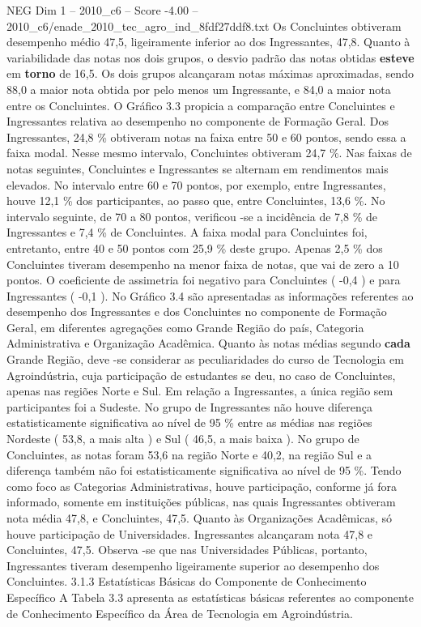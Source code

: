 \begin{textsample}{NEG Dim 1 – 2010\_c6 – Score -4.00 – 2010\_c6/enade\_2010\_tec\_agro\_ind\_8fdf27ddf8.txt}
Os Concluintes obtiveram desempenho médio 47,5, ligeiramente inferior ao dos Ingressantes, 47,8.
Quanto à variabilidade das notas nos dois grupos, o desvio padrão das notas obtidas \textbf{esteve} em \textbf{torno} de 16,5.
Os dois grupos alcançaram notas máximas aproximadas, sendo 88,0 a maior nota obtida por pelo menos um Ingressante, e 84,0 a maior nota entre os Concluintes.
O Gráfico 3.3 propicia a comparação entre Concluintes e Ingressantes relativa ao desempenho no componente de Formação Geral.
Dos Ingressantes, 24,8 \% obtiveram notas na faixa entre 50 e 60 pontos, sendo essa a faixa modal.
Nesse mesmo intervalo, Concluintes obtiveram 24,7 \%.
Nas faixas de notas seguintes, Concluintes e Ingressantes se alternam em rendimentos mais elevados.
No intervalo entre 60 e 70 pontos, por exemplo, entre Ingressantes, houve 12,1 \% dos participantes, ao passo que, entre Concluintes, 13,6 \%.
No intervalo seguinte, de 70 a 80 pontos, verificou -se a incidência de 7,8 \% de Ingressantes e 7,4 \% de Concluintes.
A faixa modal para Concluintes foi, entretanto, entre 40 e 50 pontos com 25,9 \% deste grupo.
Apenas 2,5 \% dos Concluintes tiveram desempenho na menor faixa de notas, que vai de zero a 10 pontos.
O coeficiente de assimetria foi negativo para Concluintes ( -0,4 ) e para Ingressantes ( -0,1 ).
No Gráfico 3.4 são apresentadas as informações referentes ao desempenho dos Ingressantes e dos Concluintes no componente de Formação Geral, em diferentes agregações como Grande Região do país, Categoria Administrativa e Organização Acadêmica.
Quanto às notas médias segundo \textbf{cada} Grande Região, deve -se considerar as peculiaridades do curso de Tecnologia em Agroindústria, cuja participação de estudantes se deu, no caso de Concluintes, apenas nas regiões Norte e Sul.
Em relação a Ingressantes, a única região sem participantes foi a Sudeste.
No grupo de Ingressantes não houve diferença estatisticamente significativa ao nível de 95 \% entre as médias nas regiões Nordeste ( 53,8, a mais alta ) e Sul ( 46,5, a mais baixa ).
No grupo de Concluintes, as notas foram 53,6 na região Norte e 40,2, na região Sul e a diferença também não foi estatisticamente significativa ao nível de 95 \%.
Tendo como foco as Categorias Administrativas, houve participação, conforme já fora informado, somente em instituições públicas, nas quais Ingressantes obtiveram nota média 47,8, e Concluintes, 47,5.
Quanto às Organizações Acadêmicas, só houve participação de Universidades.
Ingressantes alcançaram nota 47,8 e Concluintes, 47,5.
Observa -se que nas Universidades Públicas, portanto, Ingressantes tiveram desempenho ligeiramente superior ao desempenho dos Concluintes. 3.1.3 Estatísticas Básicas do Componente de Conhecimento Específico A Tabela 3.3 apresenta as estatísticas básicas referentes ao componente de Conhecimento Específico da Área de Tecnologia em Agroindústria.

\end{textsample}

